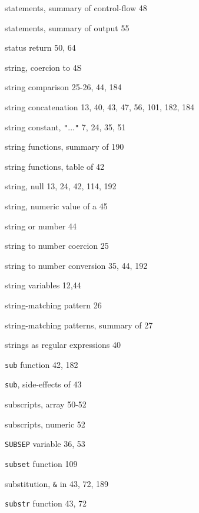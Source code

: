 \begin{multicols}{3}
\hangindent=3pc  statements, summary of control-flow 48

\hangindent=3pc  statements, summary of output 55

\hangindent=3pc  status return 50, 64

\hangindent=3pc  string, coercion to 4S

\hangindent=3pc  string comparison 25-26, 44, 184

\hangindent=3pc  string concatenation 13, 40, 43,  47, 56, 101, 182, 184

\hangindent=3pc  string constant, \verb'"'...\verb'"' 7, 24, 35, 51

\hangindent=3pc  string functions, summary of 190

\hangindent=3pc  string functions, table of 42

\hangindent=3pc  string, null 13, 24, 42, 114, 192

\hangindent=3pc  string, numeric value of a 45

\hangindent=3pc  string or number 44

\hangindent=3pc  string to number coercion 25

\hangindent=3pc  string to number conversion 35, 44, 192

\hangindent=3pc  string variables 12,44

\hangindent=3pc  string-matching pattern 26

\hangindent=3pc  string-matching patterns, summary of 27

\hangindent=3pc  strings as regular expressions 40

\hangindent=3pc  \verb'sub' function 42, 182

\hangindent=3pc  \verb'sub', side-effects of 43

\hangindent=3pc  subscripts, array 50-52

\hangindent=3pc  subscripts, numeric 52

\hangindent=3pc  \verb'SUBSEP' variable 36, 53

\hangindent=3pc  \verb'subset' function 109

\hangindent=3pc  substitution, \verb'&' in 43, 72, 189

\hangindent=3pc  \verb'substr' function 43, 72


\end{multicols}
